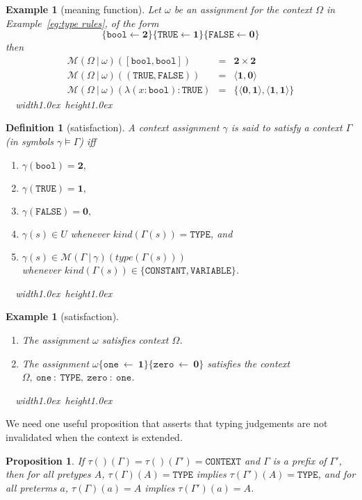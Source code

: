 \documentclass [12pt,twoside]{cslreport}
\newcommand{\thmbox}
   {{\ \hfill\hbox{%
      \vrule width1.0ex height1.0ex
   }\parfillskip 0pt }}
\newtheorem{prop}[thm]{Proposition}
\newcommand{\tuple}[1]{\langle #1 \rangle}
\newtheorem{example}[thm]{Example}
\newcommand{\tupletype}[1]{[#1]}
\newcommand{\tauGamma}[1]{\tau(\Gamma)(#1)}
\newcommand{\Mgamma}[1]{{\mathcal M}(\Gamma\vbar\gamma)(#1)}
\newcommand{\twob}{\mathbf{2}}
\newcommand{\oneb}{\mathbf{1}}
\newcommand{\zerob}{\mathbf{0}}
\newcommand{\ttbool}{\mathtt{bool}}
\newcommand{\tttrue}{\mathtt{TRUE}}
\newcommand{\ttfalse}{\mathtt{FALSE}}
\newcommand{\tttype}{\mathtt{TYPE}}
\newcommand{\ttcontext}{\mathtt{CONTEXT}}
\newcommand{\ttconstant}{\mathtt{CONSTANT}}
\newcommand{\ttvariable}{\mathtt{VARIABLE}}
\newcommand{\itkind}{\textit{kind}}
\newcommand{\ittype}{\textit{type}}
\newcommand{\vbar}{\ |\ }
\newenvironment{Eg}[1]{\begin{example}[#1]\label{eg:#1}\em }{\thmbox\end{example}}
\newtheorem{definition}{Definition}
\newenvironment{Defn}[1]{\begin{definition}[#1]\label{defn:#1}}{
\thmbox\end{definition}}
\begin{document}
\begin{Eg}{meaning function}
 Let $\omega$ be an assignment for the context $\Omega$ in
Example~\ref{eg:type rules}, of the form
$$\{\ttbool\gets \twob\}\{ \mathtt{TRUE}\gets \oneb\}\{
\mathtt{FALSE}\gets \zerob\}$$
then
\begin{eqnarray*}
\mathcal{M}(\Omega\vbar \omega)(\tupletype{\ttbool, \ttbool}) & = &
\twob\times\twob\\
%
\mathcal{M}(\Omega\vbar \omega)(( \mathtt{TRUE}, \mathtt{FALSE})) & = &
\tuple{\oneb, \zerob}\\
%
\mathcal{M}(\Omega\vbar \omega)(\lambda (x : \ttbool): \mathtt{TRUE}) & = &
\{\tuple{\zerob, \oneb}, \tuple{\oneb, \oneb}\}
\end{eqnarray*}
\end{Eg}

\begin{Defn}{satisfaction}
A context assignment $\gamma$ is said to \emph{satisfy} a context $\Gamma$
(in symbols $\gamma\models \Gamma$) 
iff
\begin{enumerate}
 \item $\gamma(\ttbool) = {\twob},$
 \item $\gamma(\tttrue) = {\oneb},$
 \item $\gamma(\ttfalse) = {\zerob},$
\item $\gamma(s)\in U$ whenever $ \itkind{}(\Gamma(s)) = \tttype$, and
 \item $\gamma(s) \in \Mgamma{ \ittype{}(\Gamma(s))}$\hfill\\\hspace*{1in}
whenever $ \itkind{}(\Gamma(s)) \in \{ \ttconstant,
\ttvariable \}$.
\end{enumerate}
\end{Defn}
\begin{Eg}{satisfaction}\hfill\\\begin{enumerate}
\item The assignment $\omega$ satisfies context $\Omega$.

\item The assignment $\omega \{ \mathtt{one}~\gets~{\oneb}\}\{
\mathtt{zero}~\gets~\zerob\}$ satisfies the context
$\Omega,~\mathtt{one~:~TYPE},~\mathtt{zero~:~one}$\@.  
\end{enumerate}
\end{Eg}

We need one useful proposition that asserts that typing judgements are not
invalidated when the context is extended.
\begin{prop}\label{context-weakening} %
If $\tau()(\Gamma) = \tau()(\Gamma') = \ttcontext$ and $\Gamma$ is
a prefix of $\Gamma'$, then for all pretypes $A$, $\tauGamma{A} = \tttype$
implies $\tau(\Gamma')(A) = \tttype$, and for all preterms $a$,
$\tauGamma{a} = A$ implies $\tau(\Gamma')(a) = A$\@.  
\end{prop}
\end{document}
